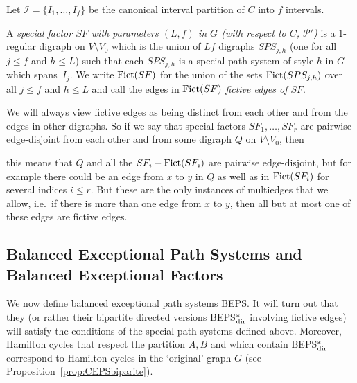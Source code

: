 \documentclass{memo-l}
\def\COMMENT#1{}
\numberwithin{section}{chapter}
\numberwithin{equation}{section}
\numberwithin{firstthm}{section}
\numberwithin{figure}{section}
\begin{document}
{Let $\mathcal{I}=\{I_1,\dots,I_f\}$ be the canonical interval partition of $C$ into $f$ intervals.%
	\COMMENT{AL: added `the canonical interval partition of $C$ into $f$ intervals'}
A \emph{special factor $SF$ with parameters $(L,f)$ in $G$ (with respect to $C$, $\mathcal P'$)}
is a $1$-regular digraph on $V\setminus V_0$
which is the union of $Lf$ digraphs $SPS_{j,h}$ (one for all $j\le f$ and $h\le L$) such that each $SPS_{j,h}$ is
a special path system of style $h$ in $G$ which spans~$I_j$.
We write ${\rm Fict}(SF)$ for the union of the sets ${\rm Fict}(SPS_{j,h})$ over all $j\le f$ and $h\le L$
and call the edges in ${\rm Fict}(SF)$ \emph{fictive edges of $SF$}.

We will always view fictive edges as being distinct from each other and from the edges in other digraphs.
So if we say that special factors $SF_1,\dots,SF_r$ are pairwise edge-disjoint from each other and from some digraph $Q$ on $V\setminus V_0$,
then%
   \COMMENT{It's not enough to have this for all $Q\subseteq G$ since in the robust decomposition lemma $H$ need not be a subgraph of $G$.}
this means that $Q$ and all the $SF_i- {\rm Fict}(SF_i)$
are pairwise edge-disjoint, but for example there could be an edge from $x$ to $y$ in $Q$ as well as in ${\rm Fict}(SF_i)$ 
for several indices $i\le r$.
But these are the only instances of multiedges that we allow, i.e.~if there is more than one edge from $x$ to $y$, then all but
at most one of these edges are fictive edges.


\subsection{Balanced Exceptional Path Systems and Balanced Exceptional Factors}\label{sec:BEPSq}
We now define balanced exceptional path systems BEPS. 
It will turn out that they (or rather their bipartite directed versions BEPS$^*_{\rm dir}$ involving fictive edges)
will satisfy the conditions of the special path systems defined above. 
Moreover,  Hamilton cycles that respect the partition $A,B$ and which contain BEPS$^*_{\rm dir}$ correspond to Hamilton cycles in the `original' graph $G$
(see Proposition~\ref{prop:CEPSbiparite}).

}
\end{document}

